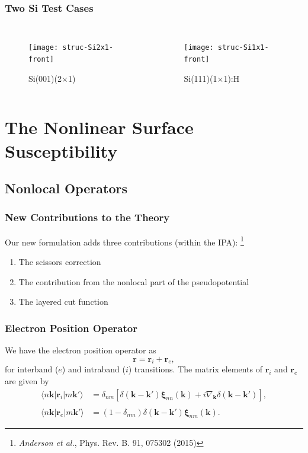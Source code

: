 \documentclass{beamer}
\begin{document}
\begin{frame}
\frametitle{Two Si Test Cases}
\begin{columns}
\begin{figure}
\centering
\texttt{[image: struc-Si2x1-front]}
\vspace{-0.4cm}
\caption{Si(001)(2$\times$1)}
\end{figure}
\begin{figure}
\centering
\texttt{[image: struc-Si1x1-front]}
\vspace{-0.4cm}
\caption{Si(111)(1$\times$1):H}
\end{figure}
\end{columns}
\end{frame}



\section{The Nonlinear Surface Susceptibility}



\subsection{Nonlocal Operators}

\begin{frame}
\frametitle{New Contributions to the Theory}
Our new formulation adds three contributions (within the IPA):%
\footnote{\emph{Anderson et al.}, Phys. Rev. B. 91, 075302 (2015)}
\begin{enumerate}
\item The scissors correction
\item The contribution from the nonlocal part of the pseudopotential
\item The layered cut function
\end{enumerate}
\end{frame}

\begin{frame}
\frametitle{Electron Position Operator}
We have the electron position operator as 
\begin{equation*}
\mathbf{r} = \mathbf{r}_{i} + \mathbf{r}_{e},
\end{equation*}
for interband ($e$) and intraband ($i$) transitions. The matrix elements of
$\mathbf{r}_{i}$ and $\mathbf{r}_{e}$ are given by
\begin{align*}
\langle n\mathbf{k}\vert \mathbf{r}_{i} |m\mathbf{k}'\rangle 
&= \delta_{nm}
\left[
  \delta(\mathbf{k} - \mathbf{k}')\boldsymbol{\xi}_{nn}(\mathbf{k})
+ i\nabla_{\mathbf{k}}\delta(\mathbf{k} - \mathbf{k}')
\right],\\\\
\langle n\mathbf{k}| \mathbf{r}_{e} |m\mathbf{k}'\rangle 
&= (1- \delta_{nm})\delta(\mathbf{k}-\mathbf{k}')
   \boldsymbol{\xi}_{nm}(\mathbf{k}).
\end{align*}
\end{frame}
\end{document}
